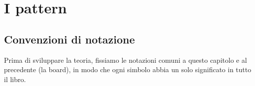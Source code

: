 %
%
%
%
%
%
%
%
\chapter{I pattern}

\section{Convenzioni di notazione}

Prima di sviluppare la teoria, fissiamo le notazioni comuni a questo capitolo e al precedente (la board),
in modo che ogni simbolo abbia un solo significato in tutto il libro.

